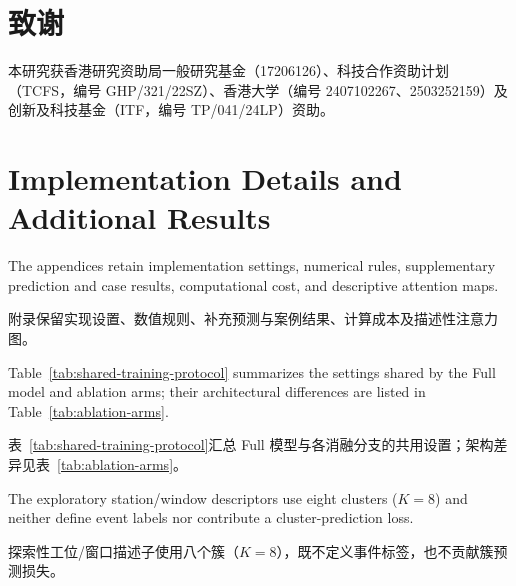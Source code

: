 \documentclass[a4paper,fleqn]{cas-dc}
\newcommand{\zhpara}[1]{%
  \par\begingroup\small\color{black!72}\noindent #1\par\endgroup}
\begin{document}
\zhpara{\section*{致谢}
本研究获香港研究资助局一般研究基金（17206126）、科技合作资助计划（TCFS，编号 GHP/321/22SZ）、香港大学（编号 2407102267、2503252159）及创新及科技基金（ITF，编号 TP/041/24LP）资助。}





\appendix
\renewcommand{\dblfloatpagefraction}{0.7}
\section{Implementation Details and Additional Results}\label{app:additional}

The appendices retain implementation settings, numerical rules, supplementary prediction and case results, computational cost, and descriptive attention maps.

\zhpara{附录保留实现设置、数值规则、补充预测与案例结果、计算成本及描述性注意力图。}


Table~\ref{tab:shared-training-protocol} summarizes the settings shared by the Full model and ablation arms; their architectural differences are listed in Table~\ref{tab:ablation-arms}.

\zhpara{表~\ref{tab:shared-training-protocol}汇总 Full 模型与各消融分支的共用设置；架构差异见表~\ref{tab:ablation-arms}。}


The exploratory station/window descriptors use eight clusters ($K=8$) and neither define event labels nor contribute a cluster-prediction loss.

\zhpara{探索性工位/窗口描述子使用八个簇（$K=8$），既不定义事件标签，也不贡献簇预测损失。}
\end{document}
